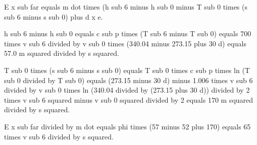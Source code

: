 E x sub far equals m dot times (h sub 6 minus h sub 0 minus T sub 0 times (s sub 6 minus s sub 0) plus d x e.

h sub 6 minus h sub 0 equals c sub p times (T sub 6 minus T sub 0) equals 700 times v sub 6 divided by v sub 0 times (340.04 minus 273.15 plus 30 d) equals 57.0 m squared divided by s squared.

T sub 0 times (s sub 6 minus s sub 0) equals T sub 0 times c sub p times ln (T sub 0 divided by T sub 0) equals (273.15 minus 30 d) minus 1.006 times v sub 6 divided by v sub 0 times ln (340.04 divided by (273.15 plus 30 d)) divided by 2 times v sub 6 squared minus v sub 0 squared divided by 2 equals 170 m squared divided by s squared.

E x sub far divided by m dot equals phi times (57 minus 52 plus 170) equals 65 times v sub 6 divided by s squared.